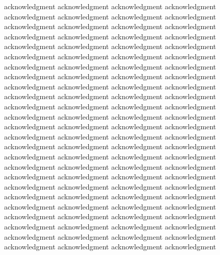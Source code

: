 \documentclass[platex,ja=standard,12pt,a4paper,twoside,onecolumn,fleqn,dvipdfmx,english]{bxjsbook}
\begin{document}
acknowledgment acknowledgment acknowledgment acknowledgment acknowledgment acknowledgment acknowledgment acknowledgment acknowledgment acknowledgment acknowledgment acknowledgment acknowledgment acknowledgment acknowledgment acknowledgment acknowledgment acknowledgment acknowledgment acknowledgment acknowledgment acknowledgment acknowledgment acknowledgment acknowledgment acknowledgment acknowledgment acknowledgment acknowledgment acknowledgment acknowledgment acknowledgment acknowledgment acknowledgment acknowledgment acknowledgment acknowledgment acknowledgment acknowledgment acknowledgment acknowledgment acknowledgment acknowledgment acknowledgment acknowledgment acknowledgment acknowledgment acknowledgment acknowledgment acknowledgment acknowledgment acknowledgment acknowledgment acknowledgment acknowledgment acknowledgment acknowledgment acknowledgment acknowledgment acknowledgment acknowledgment acknowledgment acknowledgment acknowledgment acknowledgment acknowledgment acknowledgment acknowledgment acknowledgment acknowledgment acknowledgment acknowledgment acknowledgment acknowledgment acknowledgment acknowledgment acknowledgment acknowledgment acknowledgment acknowledgment acknowledgment acknowledgment acknowledgment acknowledgment acknowledgment acknowledgment acknowledgment acknowledgment acknowledgment acknowledgment acknowledgment acknowledgment acknowledgment acknowledgment acknowledgment acknowledgment acknowledgment acknowledgment acknowledgment acknowledgment
\end{document}
